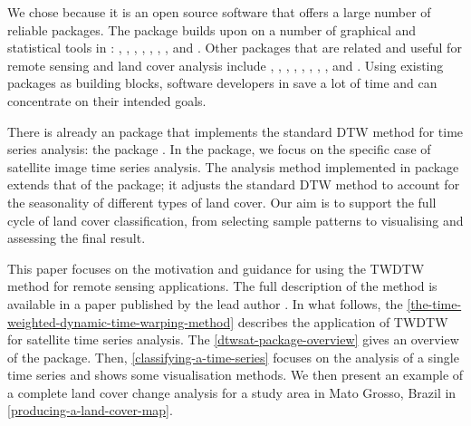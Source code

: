 \documentclass[article,shortnames]{jss}
\begin{document}
We chose  because it is an open source software that offers
a large number of reliable packages. The  package builds
upon on a number of graphical and statistical tools in :
 \citep{Giorgino:2009},  \citep{Meyer:2015},
 \citep{Zeileis:2005}, 
\citep{Wood:2000, Wood:2003, Wood:2004, Wood:2006, Wood:2011}, 
\citep{Pebesma:2005, Bivand:2013},  \citep{Hijmans:2015},
 \citep{Kuhn:2016}, and  \citep{Wickham:2009}.
Other  packages that are related and useful for remote
sensing and land cover analysis include 
\citep{Goslee:2011},  \citep{Bivand:2015}, 
\citep{Pebesma:2012, Bivand:2013}, 
\citep{Verbesselt:2010, Verbesselt:2010a}, 
\citep{Verbesselt:2011},  \citep{Dutrieux:2014},
 \citep{Tuck:2014},  \citep{Bivand:2015},
and  \citep{Moulds:2015}. Using existing packages as building
blocks, software developers in  save a lot of time and can
concentrate on their intended goals.

There is already an  package that implements the standard
DTW method for time series analysis: the  package
\citep{Giorgino:2009}. In the  package, we focus on the
specific case of satellite image time series analysis. The analysis
method implemented in  package extends that of the 
package; it adjusts the standard DTW method to account for the
seasonality of different types of land cover. Our aim is to support the
full cycle of land cover classification, from selecting sample patterns
to visualising and assessing the final result.

This paper focuses on the motivation and guidance for using the TWDTW
method for remote sensing applications. The full description of the
method is available in a paper published by the lead author
\citep{Maus:2016}. In what follows, the
\autoref{the-time-weighted-dynamic-time-warping-method} describes the
application of TWDTW \citep{Maus:2016} for satellite time series
analysis. The \autoref{dtwsat-package-overview} gives an overview of the
 package. Then, \autoref{classifying-a-time-series} focuses
on the analysis of a single time series and shows some visualisation
methods. We then present an example of a complete land cover change
analysis for a study area in Mato Grosso, Brazil in
\autoref{producing-a-land-cover-map}.
\end{document}
